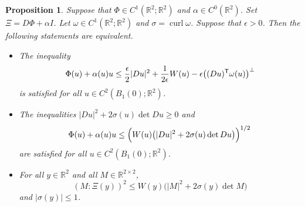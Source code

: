 \documentclass[a4paper]{article}
\newcommand{\R}{\mathbb{R}}
\newcommand{\transpose}{\mathsf{T}}
\let\div\relax\DeclareMathOperator{\div}{div}
\DeclareMathOperator{\curl}{curl}
\newtheorem{proposition}[theorem]{Proposition}
\theoremstyle{definition}
\theoremstyle{remark}
\begin{document}
\begin{proposition} \label{prp:pointwise-characterisation}
Suppose that $\Phi \in C^1(\R^2; \R^2)$ and $\alpha \in C^0(\R^2)$.
Set $\Xi = D\Phi + \alpha I$.
Let $\omega \in C^1(\R^2; \R^2)$ and $\sigma = \curl \omega$. Suppose that
$\epsilon > 0$. Then the following statements are equivalent.
\begin{itemize}
\item[(A)]
The inequality
\begin{equation} \label{eq:calibration-omega}
\div \Phi(u) + \alpha(u) \div u  \le \frac{\epsilon}{2} |Du|^2 + \frac{1}{2\epsilon} W(u) - \epsilon \div\bigl((Du)^\transpose \omega(u)\bigr)^\perp
\end{equation}
is satisfied for all $u \in C^2(B_1(0); \R^2)$.

\item[(B)]
The inequalities $|Du|^2 + 2 \sigma(u) \det Du \ge 0$ and
\[
\div \Phi(u) + \alpha(u) \div u \le \Bigl(W(u) \bigl(|Du|^2 + 2 \sigma(u) \det Du\bigr)\Bigr)^{1/2}
\]
are satisfied for all $u \in C^2(B_1(0); \R^2)$.

\item[(C)]
For all $y \in \R^2$ and all $M \in \R^{2 \times 2}$,
\[
(M : \Xi(y))^2 \le W(y) \bigl(|M|^2 + 2 \sigma(y) \det M\bigr)
\]
and $|\sigma(y)| \le 1$.
\end{itemize}
\end{proposition}
\end{document}
